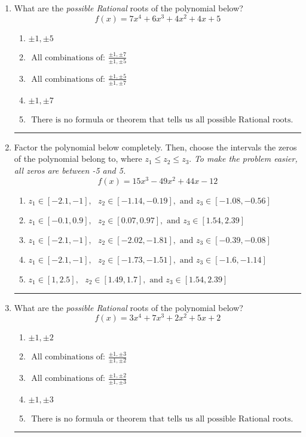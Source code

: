 \documentclass[14pt]{extbook}
\newcommand{\litem}[1]{\item#1\hspace*{-1cm}\rule{\textwidth}{0.4pt}}
\begin{document}
\begin{enumerate}
\litem{
What are the \textit{possible Rational} roots of the polynomial below?\[ f(x) = 7x^{4} +6 x^{3} +4 x^{2} +4 x + 5 \]\begin{enumerate}[label=\Alph*.]
\item \( \pm 1,\pm 5 \)
\item \( \text{ All combinations of: }\frac{\pm 1,\pm 7}{\pm 1,\pm 5} \)
\item \( \text{ All combinations of: }\frac{\pm 1,\pm 5}{\pm 1,\pm 7} \)
\item \( \pm 1,\pm 7 \)
\item \( \text{ There is no formula or theorem that tells us all possible Rational roots.} \)

\end{enumerate} }
\litem{
Factor the polynomial below completely. Then, choose the intervals the zeros of the polynomial belong to, where $z_1 \leq z_2 \leq z_3$. \textit{To make the problem easier, all zeros are between -5 and 5.}\[ f(x) = 15x^{3} -49 x^{2} +44 x -12 \]\begin{enumerate}[label=\Alph*.]
\item \( z_1 \in [-2.1, -1], \text{   }  z_2 \in [-1.14, -0.19], \text{   and   } z_3 \in [-1.08, -0.56] \)
\item \( z_1 \in [-0.1, 0.9], \text{   }  z_2 \in [0.07, 0.97], \text{   and   } z_3 \in [1.54, 2.39] \)
\item \( z_1 \in [-2.1, -1], \text{   }  z_2 \in [-2.02, -1.81], \text{   and   } z_3 \in [-0.39, -0.08] \)
\item \( z_1 \in [-2.1, -1], \text{   }  z_2 \in [-1.73, -1.51], \text{   and   } z_3 \in [-1.6, -1.14] \)
\item \( z_1 \in [1, 2.5], \text{   }  z_2 \in [1.49, 1.7], \text{   and   } z_3 \in [1.54, 2.39] \)

\end{enumerate} }
\litem{
What are the \textit{possible Rational} roots of the polynomial below?\[ f(x) = 3x^{4} +7 x^{3} +2 x^{2} +5 x + 2 \]\begin{enumerate}[label=\Alph*.]
\item \( \pm 1,\pm 2 \)
\item \( \text{ All combinations of: }\frac{\pm 1,\pm 3}{\pm 1,\pm 2} \)
\item \( \text{ All combinations of: }\frac{\pm 1,\pm 2}{\pm 1,\pm 3} \)
\item \( \pm 1,\pm 3 \)
\item \( \text{ There is no formula or theorem that tells us all possible Rational roots.} \)


\end{enumerate}}
\end{enumerate}
\end{document}
